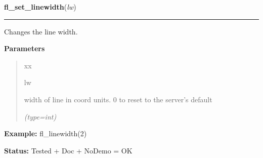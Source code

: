 \hspace{.8\funcindent}\begin{boxedminipage}{\funcwidth}

    \raggedright \textbf{fl\_set\_linewidth}(\textit{lw})

    \vspace{-1.5ex}

    \rule{\textwidth}{0.5\fboxrule}
\setlength{\parskip}{2ex}
    Changes the line width.

\setlength{\parskip}{1ex}
      \textbf{Parameters}
      \vspace{-1ex}

      \begin{quote}
        \begin{Ventry}{xx}

          \item[lw]

          width of line in coord units. 0 to reset to the server's default

            {\it (type=int)}

        \end{Ventry}

      \end{quote}

\textbf{Example:} fl\_linewidth(2)



\textbf{Status:} Tested + Doc + NoDemo = OK



    \end{boxedminipage}

    \label{xformslib:flxbasic:fl_linestyle}

    \vspace{0.5ex}


